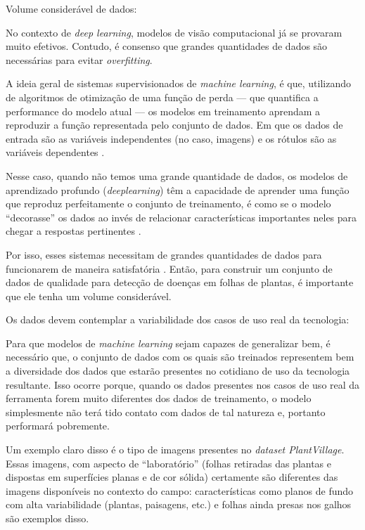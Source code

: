 \begin{enumerate}
{\bf \item  Volume considerável de dados:}

No contexto de \emph{deep learning}, modelos de visão computacional já se provaram muito efetivos. Contudo, é consenso que grandes quantidades de dados são necessárias para evitar \emph{overfitting}.

A ideia geral de sistemas supervisionados de \emph{machine learning}, é que, utilizando de algoritmos de otimização de uma função de perda --- que quantifica a performance do modelo atual --- os modelos em treinamento aprendam a reproduzir a função representada pelo conjunto de dados. Em que os dados de entrada são as variáveis independentes (no caso, imagens) e os rótulos são as variáveis dependentes \citep{Yaser:2012}. 

Nesse caso, quando não temos uma grande quantidade de dados, os modelos de aprendizado profundo (\emph{deeplearning}) têm a capacidade de aprender uma função que reproduz perfeitamente o conjunto de treinamento, é como se o modelo ``decorasse'' os dados ao invés de relacionar características importantes neles para chegar a respostas pertinentes \citep{Yaser:2012, Shorten2019A}. 

Por isso, esses sistemas necessitam de grandes quantidades de dados para funcionarem de maneira satisfatória \citep{Shorten2019A}. Então, para construir um conjunto de dados de qualidade para detecção de doenças em folhas de plantas, é importante que ele tenha um volume considerável.

{\bf \item Os dados devem contemplar a variabilidade dos casos de uso real da tecnologia:}
Para que modelos de \emph{machine learning} sejam capazes de generalizar bem, é necessário que, o conjunto de dados com os quais são treinados representem bem a diversidade dos dados que estarão presentes no cotidiano de uso da tecnologia resultante. Isso ocorre porque, quando os dados presentes nos casos de uso real da ferramenta forem muito diferentes dos dados de treinamento, o modelo simplesmente não terá tido contato com dados de tal natureza e, portanto performará pobremente. 

Um exemplo claro disso é o tipo de imagens presentes no \emph{dataset PlantVillage}. Essas imagens, com aspecto de ``laboratório'' (folhas retiradas das plantas e dispostas em superfícies planas e de cor sólida) certamente são diferentes das imagens disponíveis no contexto do campo: características como planos de fundo com alta variabilidade (plantas, paisagens, etc.) e folhas ainda presas nos galhos são exemplos disso.


\end{enumerate}
